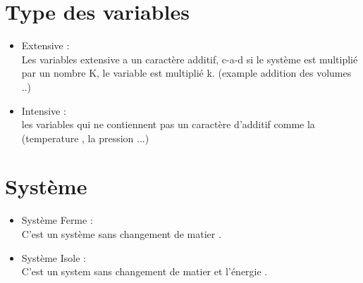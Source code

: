 \documentclass[12pt,oneside]{book}
\begin{document}
\section{Type des variables}
\begin{itemize}
    \item Extensive :\\
          Les variables extensive a un caractère additif, c-a-d si le système est multiplié par un nombre K, le variable est multiplié k. (example addition des volumes ..)
    \item Intensive : \\
          les variables qui ne contiennent pas un caractère d'additif comme la (temperature , la pression ...)
\end{itemize}
\section{Système}
\begin{itemize}
    \item Système Ferme : \\
          C'est un système sans changement de matier .
    \item Système Isole : \\
          C'est un system sans changement de matier et l’énergie .
\end{itemize}
\end{document}
